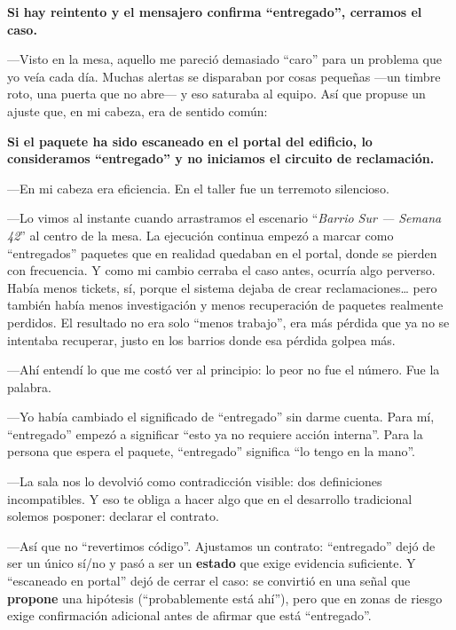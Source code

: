 \documentclass[11pt,a4paper]{article}
\begin{document}
\begin{center}
\textbf{Si hay reintento y el mensajero confirma ``entregado'', cerramos el
caso.}
\end{center}

---Visto en la mesa, aquello me pareció demasiado ``caro'' para un problema
que yo veía cada día. Muchas alertas se disparaban por cosas pequeñas ---un
timbre roto, una puerta que no abre--- y eso saturaba al equipo. Así que
propuse un ajuste que, en mi cabeza, era de sentido común:

\begin{center}
\textbf{Si el paquete ha sido escaneado en el portal del edificio, lo
consideramos ``entregado'' y no iniciamos el circuito de reclamación.}
\end{center}

---En mi cabeza era eficiencia. En el taller fue un terremoto silencioso.

---Lo vimos al instante cuando arrastramos el escenario ``\emph{Barrio Sur ---
Semana 42}'' al centro de la mesa. La ejecución continua empezó a marcar como
``entregados'' paquetes que en realidad quedaban en el portal, donde se
pierden con frecuencia. Y como mi cambio cerraba el caso antes, ocurría algo
perverso. Había menos tickets, sí, porque el sistema dejaba de crear
reclamaciones\ldots{} pero también había menos investigación y menos
recuperación de paquetes realmente perdidos. El resultado no era solo ``menos
trabajo'', era más pérdida que ya no se intentaba recuperar, justo en los
barrios donde esa pérdida golpea más.

---Ahí entendí lo que me costó ver al principio: lo peor no fue el número. Fue
la palabra.

---Yo había cambiado el significado de ``entregado'' sin darme cuenta. Para
mí, ``entregado'' empezó a significar ``esto ya no requiere acción interna''.
Para la persona que espera el paquete, ``entregado'' significa ``lo tengo en
la mano''.

---La sala nos lo devolvió como contradicción visible: dos definiciones
incompatibles. Y eso te obliga a hacer algo que en el desarrollo tradicional
solemos posponer: declarar el contrato.

---Así que no ``revertimos código''. Ajustamos un contrato: ``entregado'' dejó
de ser un único sí/no y pasó a ser un \textbf{estado} que exige evidencia
suficiente. Y ``escaneado en portal'' dejó de cerrar el caso: se convirtió en
una señal que \textbf{propone} una hipótesis (``probablemente está ahí''),
pero que en zonas de riesgo exige confirmación adicional antes de afirmar que
está ``entregado''.
\end{document}
